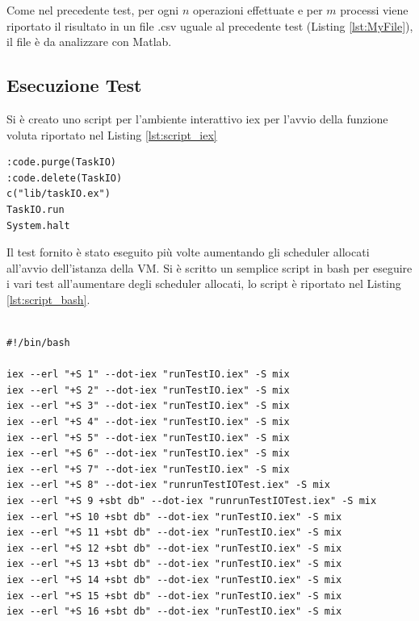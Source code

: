 Come nel precedente test, per ogni
$n$ operazioni effettuate e per $m$
processi viene riportato il risultato in un file .csv
uguale al precedente test (Listing \ref{lst:MyFile}),
il file è da analizzare con Matlab.




\subsection{Esecuzione Test}

Si è creato uno script per l'ambiente interattivo iex per l'avvio
della funzione voluta riportato nel Listing \ref{lst:script_iex}

\begin{lstlisting}[language=none,captionpos=b,
	caption={Script iex per l'avvio dei test "runTestIO.iex},
	label={lst:script_iex}]
:code.purge(TaskIO)
:code.delete(TaskIO)
c("lib/taskIO.ex")
TaskIO.run
System.halt
\end{lstlisting}
	
Il test fornito è stato eseguito più volte aumentando
gli scheduler allocati all'avvio dell'istanza della VM.
Si è scritto un semplice script in bash per eseguire
i vari test all'aumentare degli scheduler allocati, lo script
è riportato nel Listing \ref{lst:script_bash}.


\begin{lstlisting}[language=none,captionpos=b,
	caption={Script bash per l'avvio dei test},
	label={lst:script_bash}]

#!/bin/bash

iex --erl "+S 1" --dot-iex "runTestIO.iex" -S mix
iex --erl "+S 2" --dot-iex "runTestIO.iex" -S mix
iex --erl "+S 3" --dot-iex "runTestIO.iex" -S mix
iex --erl "+S 4" --dot-iex "runTestIO.iex" -S mix
iex --erl "+S 5" --dot-iex "runTestIO.iex" -S mix
iex --erl "+S 6" --dot-iex "runTestIO.iex" -S mix
iex --erl "+S 7" --dot-iex "runTestIO.iex" -S mix
iex --erl "+S 8" --dot-iex "runrunTestIOTest.iex" -S mix
iex --erl "+S 9 +sbt db" --dot-iex "runrunTestIOTest.iex" -S mix
iex --erl "+S 10 +sbt db" --dot-iex "runTestIO.iex" -S mix
iex --erl "+S 11 +sbt db" --dot-iex "runTestIO.iex" -S mix
iex --erl "+S 12 +sbt db" --dot-iex "runTestIO.iex" -S mix
iex --erl "+S 13 +sbt db" --dot-iex "runTestIO.iex" -S mix
iex --erl "+S 14 +sbt db" --dot-iex "runTestIO.iex" -S mix
iex --erl "+S 15 +sbt db" --dot-iex "runTestIO.iex" -S mix
iex --erl "+S 16 +sbt db" --dot-iex "runTestIO.iex" -S mix
	
\end{lstlisting}

